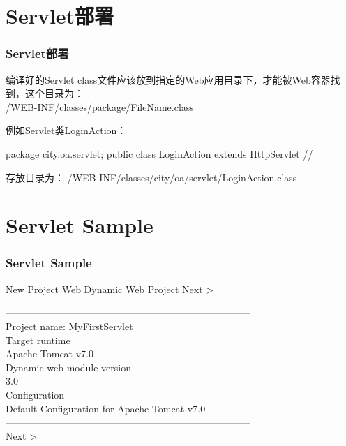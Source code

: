 \section{Servlet部署}

\begin{frame}[fragile] %
\frametitle{Servlet部署}

编译好的Servlet class文件应该放到指定的Web应用目录下，才能被Web容器找到，这个目录为：\\
{\Red /WEB-INF/classes/package/FileName.class}

例如Servlet类LoginAction：
\begin{javaCode}
package city.oa.servlet;
public class LoginAction extends HttpServlet {
  //     
}
\end{javaCode}

存放目录为：
{\Blue /WEB-INF/classes/city/oa/servlet/LoginAction.class}
\end{frame}

\section{Servlet Sample} 

\begin{frame}[fragile] %
\frametitle{Servlet Sample} 

New Project  Web  Dynamic Web Project  Next >

---------------------------------------------------------------------------\\
Project name: {\Blue MyFirstServlet}\\
Target runtime\\ {\Blue Apache Tomcat v7.0}\\
Dynamic web module version\\ 3.0\\
Configuration\\ {\Blue Default Configuration for Apache Tomcat v7.0}\\
---------------------------------------------------------------------------\\
 Next >
\end{frame}


